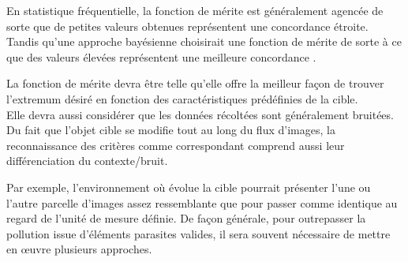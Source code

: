 \documentclass[a4paper,11pt]{report}
\begin{document}
En statistique fréquentielle, la fonction de mérite est généralement agencée de sorte que de petites valeurs obtenues représentent une concordance étroite. Tandis qu'une approche bayésienne choisirait une fonction de mérite de sorte à ce que des valeurs élevées représentent une meilleure concordance \cite{n}.

La fonction de mérite devra être telle qu'elle offre la meilleur façon de trouver l'extremum désiré en fonction des caractéristiques prédéfinies de la cible.\\

Elle devra aussi considérer que les données récoltées sont généralement bruitées.
Du fait que l'objet cible se modifie tout au long du flux d'images, la reconnaissance des critères comme correspondant comprend aussi leur différenciation du contexte/bruit. 

Par exemple, l'environnement où évolue la cible pourrait présenter l'une ou l'autre parcelle d'images assez ressemblante que pour passer comme identique au regard de l'unité de mesure définie.
De façon générale, pour outrepasser la pollution issue d'éléments parasites valides, il sera souvent nécessaire de mettre en œuvre plusieurs approches.
\end{document}
